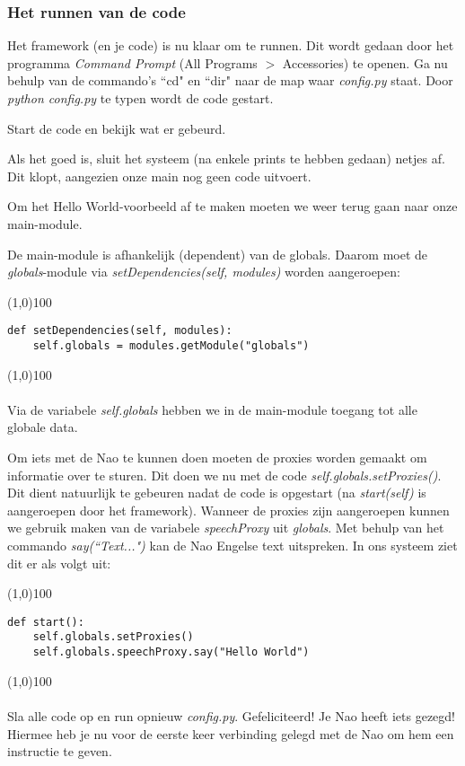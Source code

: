 \documentclass[a4paper]{article}
\begin{document}
\subsubsection{Het runnen van de code}
Het framework (en je code) is nu klaar om te runnen. Dit wordt gedaan door het programma \textit{Command Prompt} (All Programs $>$ Accessories) te openen. 
Ga nu behulp van de commando's ``cd"  en ``dir" naar de map waar \textit{config.py} staat.
Door \textit{python config.py} te typen wordt de code gestart.

Start de code en bekijk wat er gebeurd.

Als het goed is, sluit het systeem (na enkele prints te hebben gedaan) netjes af. Dit klopt, aangezien onze main nog geen code uitvoert.

Om het Hello World-voorbeeld af te maken moeten we weer terug gaan naar onze main-module.

De main-module is afhankelijk (dependent) van de globals. Daarom moet de \textit{globals}-module via \textit{setDependencies(self, modules)} worden aangeroepen:

\noindent \line(1,0){100}
\begin{verbatim}
def setDependencies(self, modules):
    self.globals = modules.getModule("globals")
\end{verbatim}
\noindent \line(1,0){100}
\\\\
Via de variabele \textit{self.globals} hebben we in de main-module toegang tot alle globale data.

Om iets met de Nao te kunnen doen moeten de proxies worden gemaakt om informatie over te sturen. Dit doen we nu met de code \textit{self.globals.setProxies()}. Dit dient natuurlijk te gebeuren nadat de code is opgestart (na \textit{start(self)} is aangeroepen door het framework).
Wanneer de proxies zijn aangeroepen kunnen we gebruik maken van de variabele \textit{speechProxy} uit \textit{globals}.
Met behulp van het commando \textit{say(``Text...")} kan de Nao Engelse text uitspreken. In ons systeem ziet dit er als volgt uit:

\noindent \line(1,0){100}
\begin{verbatim}
def start():
    self.globals.setProxies()
    self.globals.speechProxy.say("Hello World")
\end{verbatim}
\noindent \line(1,0){100}
\\\\
Sla alle code op en run opnieuw \textit{config.py}. Gefeliciteerd! Je Nao heeft iets gezegd! Hiermee heb je nu voor de eerste keer verbinding gelegd met de Nao om hem een instructie te geven.
\end{document}
